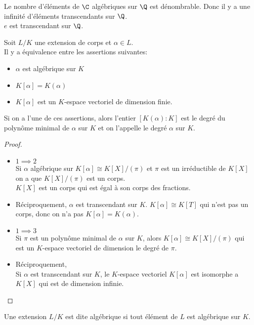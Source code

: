 \begin{remarque}
	Le nombre d'éléments de $\C$ algébriques sur $\Q$ est dénombrable. Donc il y a une infinité d'éléments transcendants sur $\Q$.\\
	$e$ est transcendant sur $\Q$.
\end{remarque}


\begin{prop}
	Soit $L/K$ une extension de corps et $\alpha \in L$.\\
	Il y a équivalence entre les assertions suivantes:
	\begin{itemize}
		\item  $\alpha$ est algébrique sur $K$
		\item $K[\alpha] = K(\alpha)$
		\item $K[\alpha]$ est un $K$-espace vectoriel de dimension finie.
	\end{itemize}
	Si on a l'une de ces assertions, alors l'entier $[K(\alpha) : K]$ est le degré du polynôme minimal de $\alpha$ sur $K$ et on l'appelle le degré $\alpha$ sur $K$.
\end{prop}

\begin{proof}
	\begin{itemize}
		\item $1 \implies 2$\\
		      Si $\alpha$ algébrique sur $K[\alpha] \cong K[X]/(\pi)$ et $\pi$ est un irréductible de $K[X]$ on a que $K[X]/(\pi)$ est un corps.\\
		      $K[X]$ est un corps qui est égal à son corps des fractions.
		\item Réciproquement, $\alpha$ est transcendant sur $K$.
		      $K[\alpha] \cong K[T]$ qui n'est pas un corps, donc on n'a pas $K[\alpha] = K(\alpha)$.
		\item $1 \implies 3$\\
		      Si $\pi$ est un polynôme minimal de $\alpha$ sur $K$, alors $K[\alpha] \cong K[X]/(\pi)$ qui est un $K$-espace vectoriel de dimension le degré de $\pi$.
		\item Réciproquement, \\
		      Si $\alpha$ est transcendant sur $K$, le $K$-espace vectoriel $K[\alpha]$ est isomorphe a $K[X]$ qui est de dimension infinie.
	\end{itemize}
\end{proof}

\begin{definition}
	Une extension $L/K$ est dite algébrique si tout élément de $L$ est algébrique sur $K$.\\
\end{definition}

